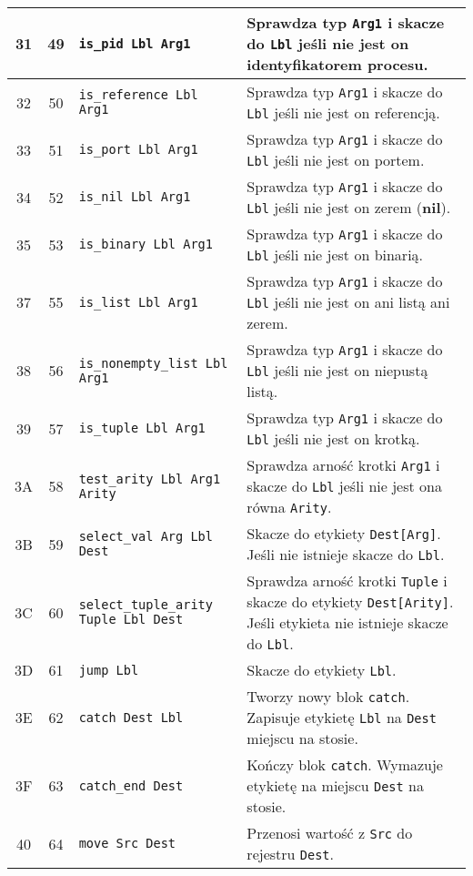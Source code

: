\begin{longtable}{|c|c|p{5cm}|p{7cm}|}
\hline
31 & 49 & \texttt{is\_pid Lbl Arg1} & Sprawdza typ \texttt{Arg1} i skacze do \texttt{Lbl} jeśli nie jest on identyfikatorem procesu.\\
\hline
32 & 50 & \texttt{is\_reference Lbl Arg1} & Sprawdza typ \texttt{Arg1} i skacze do \texttt{Lbl} jeśli nie jest on referencją.\\
\hline
33 & 51 & \texttt{is\_port Lbl Arg1} & Sprawdza typ \texttt{Arg1} i skacze do \texttt{Lbl} jeśli nie jest on portem.\\
\hline
34 & 52 & \texttt{is\_nil Lbl Arg1} & Sprawdza typ \texttt{Arg1} i skacze do \texttt{Lbl} jeśli nie jest on zerem (\textbf{nil}).\\
\hline
35 & 53 & \texttt{is\_binary Lbl Arg1} & Sprawdza typ \texttt{Arg1} i skacze do \texttt{Lbl} jeśli nie jest on binarią.\\
\hline
37 & 55 & \texttt{is\_list Lbl Arg1} & Sprawdza typ \texttt{Arg1} i skacze do \texttt{Lbl} jeśli nie jest on ani listą ani zerem.\\
\hline
38 & 56 & \texttt{is\_nonempty\_list Lbl Arg1} & Sprawdza typ \texttt{Arg1} i skacze do \texttt{Lbl} jeśli nie jest on niepustą listą.\\
\hline
39 & 57 & \texttt{is\_tuple Lbl Arg1} & Sprawdza typ \texttt{Arg1} i skacze do \texttt{Lbl} jeśli nie jest on krotką.\\
\hline
3A & 58 & \texttt{test\_arity Lbl Arg1 Arity} & Sprawdza arność krotki \texttt{Arg1} i skacze do \texttt{Lbl} jeśli nie jest ona równa \texttt{Arity}.\\
\hline
3B & 59 & \texttt{select\_val Arg Lbl Dest} & Skacze do etykiety \texttt{Dest[Arg]}. Jeśli nie istnieje skacze do \texttt{Lbl}. \\
\hline
3C & 60 & \texttt{select\_tuple\_arity Tuple Lbl Dest} & Sprawdza arność krotki \texttt{Tuple} i skacze do etykiety \texttt{Dest[Arity]}. Jeśli etykieta nie istnieje skacze do \texttt{Lbl}. \\
\hline
3D & 61 & \texttt{jump Lbl} & Skacze do etykiety \texttt{Lbl}. \\
\hline
3E & 62 & \texttt{catch Dest Lbl} & Tworzy nowy blok \texttt{catch}. Zapisuje etykietę \texttt{Lbl} na \texttt{Dest} miejscu na stosie. \\
\hline
3F & 63 & \texttt{catch\_end Dest} & Kończy blok \texttt{catch}. Wymazuje etykietę na miejscu \texttt{Dest} na stosie. \\
\hline
40 & 64 & \texttt{move Src Dest} & Przenosi wartość z \texttt{Src} do rejestru \texttt{Dest}. \\

\end{longtable}
